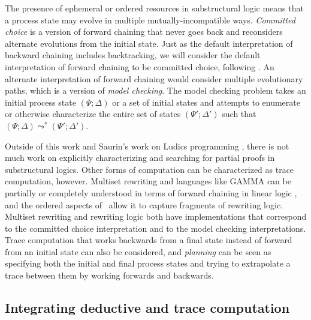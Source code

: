The presence of ephemeral or ordered resources in substructural logic
means that a process state may evolve in multiple
mutually-incompatible ways. {\it Committed choice} is a version of
forward chaining that never goes back and reconsiders alternate
evolutions from the initial state. Just as the default interpretation
of backward chaining includes backtracking, we will consider the
default interpretation of forward chaining to be committed choice,
following \cite{lopez05monadic}.  An
alternate interpretation of forward chaining would consider multiple
evolutionary paths, which is a version of {\it model checking}.  The
model checking problem takes an initial process state $(\Psi;\Delta)$
or a set of initial states and attempts to enumerate or otherwise
characterize the entire set of states $(\Psi'; \Delta')$ such that
$(\Psi; \Delta) \leadsto^* (\Psi'; \Delta')$. 

Outside of this work and Saurin's work on Ludics programming
\cite{saurin08towards}, there is not much work on explicitly
characterizing and searching for partial proofs in substructural
logics. Other forms of computation can be characterized as trace
computation, however.  Multiset rewriting and languages like GAMMA can
be partially or completely understood in terms of forward chaining in
linear logic \cite{cervesato09relating,paola96linear}, and the ordered
aspects of \sls~allow it to capture fragments of rewriting
logic. Multiset rewriting and rewriting logic both have
implementations that correspond to the committed choice interpretation
and to the model checking interpretations.  Trace computation that
works backwards from a final state instead of forward from an initial
state can also be considered, and {\it planning} can be seen as
specifying both the initial and final process states and trying to
extrapolate a trace between them by working forwards and backwards.





\subsection{Integrating deductive and trace computation}

